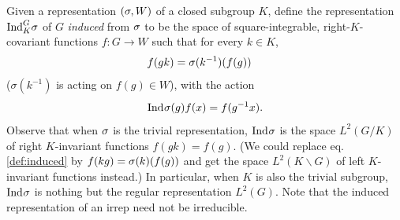 Given a representation $(\sigma,W)$ of a closed subgroup $K$, define the representation $\text{Ind}_{K}^{G} {\sigma}$ of $G$ \emph{induced} from $\sigma$ to be the space of square-integrable, right-$K$-covariant functions $f: G \to W$ such that for every $k \in K$,
\begin{align}\label{def:induced}
f(gk) &= \krep(k^{-1}) (f(g))
\end{align}
($\sigma(k^{-1})$ is acting on $f(g) \in W$), with the action \cite{Knapp}
\begin{align}\label{def:induced-action}
	\ind{\krep}{}{}(g) f(x) = f(g^{-1}x).
\end{align}
Observe that when $\sigma$ is the trivial representation, $\text{Ind}_{}^{} {\sigma}$ is the space $L^2(G/K)$ of right $K$-invariant functions $f(gk) = f(g)$. (We could replace eq. \eqref{def:induced} by $f(kg) = \sigma(k)(f(g))$ and get the space $L^2(K\backslash G)$ of left $K$-invariant functions instead.) In particular, when $K$ is also the trivial subgroup, $\text{Ind}_{}^{} {\sigma}$ is nothing but the regular representation $L^2(G)$. Note that the induced representation of an irrep need not be irreducible.

